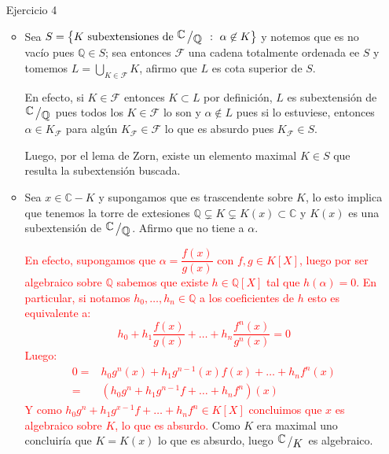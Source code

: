\documentclass[11pt]{article}
\newcommand{\F}{\mathcal{F}}
\newcommand{\C}{\mathbb{C}}
\newcommand{\Q}{\mathbb{Q}}
\newcommand\tq{~:~}
\newcommand{\sett}[1]{\left\lbrace#1\right\rbrace}
\newcommand{\Bigcup}[2]{\bigcup\limits_{#1}{#2}}
\newcommand{\quotient}[2]{{\raisebox{.2em}{$#1$}\left/\raisebox{-.2em}{$#2$}\right.}}
\numberwithin{theorem}{subsection}
\newcommand{\qed}{\nobreak \ifvmode \relax \else
	\ifdim\lastskip<1.5em \hskip-\lastskip
	\hskip1.5em plus0em minus0.5em \fi \nobreak
	\vrule height0.75em width0.5em depth0.25em\fi}
\begin{document}
\begin{enumerate}
\begin{itemize}
		Luego, $[\Q[\sqrt[p]{5}, \xi_n]:\Q[\sqrt[p]{5}]] = \varphi(n)$ para este caso tambi\'en y entonces conclu\'imos que $\Phi_n$ resulta irreducible en $Q[\sqrt[p]{5}]$ para todo $p>2$.\qed 
		
	\end{itemize}
	
	\item[Ejercicio 4]
	
	\begin{itemize}
		\item Sea $S = \sett{K \text{ subextensiones de } \quotient{\C}{\Q} \tq \alpha \not \in K}$ y notemos que es no vac\'io pues $\Q \in S$; sea entonces $\F$ una cadena totalmente ordenada ee $S$ y tomemos $L = \Bigcup{K \in \F}{K}$, afirmo que $L$ es cota superior de $S$.
		
		En efecto, si $K \in \F$ entonces $K \subset L$ por definici\'on, $L$ es subextensi\'on de $\quotient{\C}{\Q}$ pues todos los $K \in \F$ lo son y $\alpha \not \in L$ pues si lo estuviese, entonces $\alpha \in K_{\F}$ para alg\'un $K_{\F} \in \F$ lo que es absurdo pues $K_{\F} \in S$.
	
		Luego, por el lema de Zorn, existe un elemento maximal $K \in S$ que resulta la subextensi\'on buscada.
		
		\item Sea $x \in \C - K$ y supongamos que es trascendente sobre $K$, lo esto implica que tenemos la torre de extesiones $\Q \subsetneq K \subsetneq K(x) \subset \C$ y $K(x)$ es una subextensi\'on de $\quotient{\C}{\Q}$. Afirmo que no tiene a $\alpha$.
		
		\textcolor{red}{En efecto, supongamos que $\alpha = \dfrac{f(x)}{g(x)}$ con $f,g \in K[X]$, luego por ser algebraico sobre $\Q$ sabemos que existe $h \in \Q[X]$ tal que $h(\alpha) = 0$. En particular, si notamos $h_0, \dots, h_n \in \Q$ a los coeficientes de $h$ esto es equivalente a:
		\begin{equation*}
			h_0 + h_1\dfrac{f(x)}{g(x)} + \dots + h_n\dfrac{f^n(x)}{g^n(x)} = 0
		\end{equation*}
		Luego:
		\begin{equation*}
		\begin{aligned}
			0 = & h_0g^n(x) + h_1g^{n-1}(x)f(x) + \dots + h_nf^n(x) \\
			=& \left(h_0g^n + h_1g^{n-1}f + \dots + h_n f^n\right) (x)
		\end{aligned}
		\end{equation*}
		Y como $h_0g^n + h_1g^{x-1}f + \dots + h_nf^n \in K[X]$ concluimos que $x$ es algebraico sobre $K$, lo que es absurdo.
	}
		Como $K$ era maximal uno concluir\'ia que $K = K(x)$ lo que es absurdo, luego $\quotient{\C}{K}$ es algebraico.
	

\end{itemize}
\end{enumerate}
\end{document}
